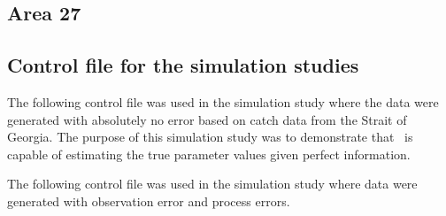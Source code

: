 \subsection{Area 27}
\begin{multicols}{2}

\tiny
\begin{alltt}
 
\end{alltt}
\normalsize

\tiny
\begin{alltt}
 
\end{alltt}
\normalsize

\end{multicols}


\subsection{Control file for the simulation studies}
\begin{multicols}{2}
The following control file was used in the simulation study where the data were generated with absolutely no error based on catch data from the Strait of Georgia.  The purpose of this simulation study was  to demonstrate that \iscam\ is capable of estimating the true parameter values given perfect information.

\tiny
\begin{alltt}
 
\end{alltt}\label{TableSOGsimCtrl}
\normalsize

The following control file was used in the simulation study where data were generated with observation error and process errors.

\tiny
\begin{alltt}
 
\end{alltt}\label{TableSOGmcCtrl}
\normalsize

\end{multicols}





